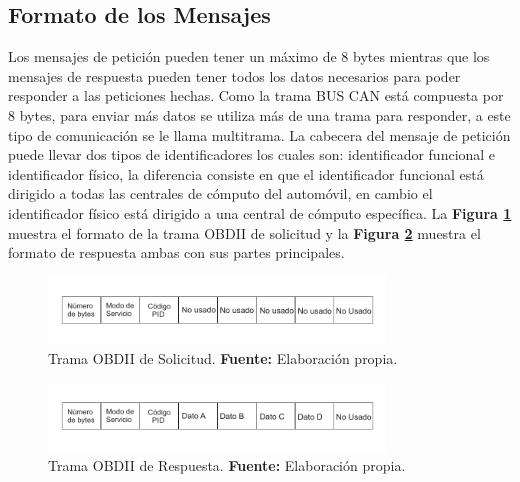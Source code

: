 \subsection{Formato de los Mensajes}

Los mensajes de petición pueden tener un máximo de 8 bytes mientras que los mensajes de respuesta pueden tener todos los datos necesarios para poder responder a las peticiones hechas.
Como la trama BUS CAN está compuesta por 8 bytes, para enviar más datos se utiliza más de una trama para responder, a este tipo de comunicación se le llama multitrama.
La cabecera del mensaje de petición puede llevar dos tipos de identificadores los cuales son: identificador funcional e identificador físico, la diferencia consiste en que el identificador funcional está dirigido a todas las centrales de cómputo del automóvil, en cambio el identificador físico está dirigido a una central de cómputo específica.
La \textbf{Figura \ref{TOBD}} muestra el formato de la trama OBDII de solicitud y la \textbf{Figura \ref{TOBDR}} muestra el formato de respuesta ambas con sus partes principales.

\begin{figure}[H]
	\centering
		\includegraphics[width=0.8\textwidth]{./Cap3imagen/TramaOBDIIpregunta.pdf}
	\caption[Trama OBDII.]{Trama OBDII de Solicitud.\textbf{ Fuente:} Elaboración propia.}
	\label{TOBD} %
\end{figure}

\begin{figure}[H]
	\centering
		\includegraphics[width=0.8\textwidth]{./Cap3imagen/TramaOBDIIrespuesta.pdf}
	\caption[Trama OBDII de Respuesta.]{Trama OBDII de Respuesta.\textbf{ Fuente:} Elaboración propia.}
	\label{TOBDR} %
\end{figure}

